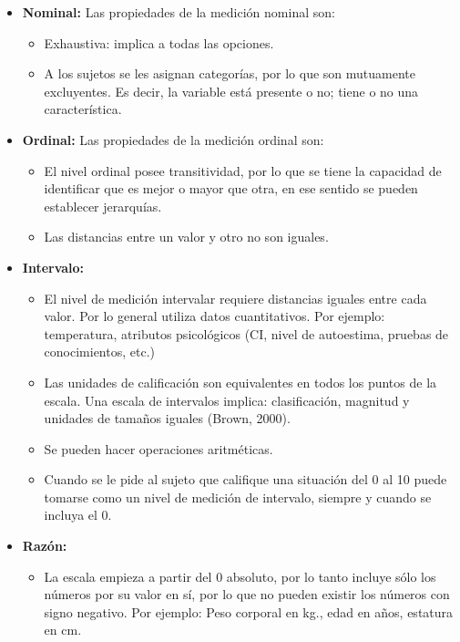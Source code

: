 \documentclass[a4paper]{report} %
\begin{document}
\begin{itemize}
\item \textbf{Nominal:} Las propiedades de la medici\'on nominal son:
\begin{itemize}
\item Exhaustiva: implica a todas las opciones.
\item A los sujetos se les asignan categor\'ias, por lo que son mutuamente excluyentes. Es decir, la variable est\'a presente o no; tiene o no una caracter\'istica.
\end{itemize}
\item \textbf{Ordinal:} Las propiedades de la medici\'on ordinal son:
\begin{itemize}
\item El nivel ordinal posee transitividad, por lo que se tiene la capacidad de identificar que es mejor o mayor que otra, en ese sentido se pueden establecer jerarqu\'ias.
\item Las distancias entre un valor y otro no son iguales.
\end{itemize}
\item \textbf{Intervalo:} 
\begin{itemize}
\item El nivel de medici\'on intervalar requiere distancias iguales entre cada valor. Por lo general utiliza datos cuantitativos. Por ejemplo: temperatura, atributos psicol\'ogicos (CI, nivel de autoestima, pruebas de conocimientos, etc.)
\item Las unidades de calificaci\'on son equivalentes en todos los puntos de la escala. Una escala de intervalos implica: clasificaci\'on, magnitud y unidades de tama\~nos iguales (Brown, 2000).
\item Se pueden hacer operaciones aritm\'eticas.
\item Cuando se le pide al sujeto que califique una situaci\'on del 0 al 10 puede tomarse como un nivel de medici\'on de intervalo, siempre y cuando se incluya el 0.
\end{itemize}
\item \textbf{Raz\'on:} 
\begin{itemize}
\item La escala empieza a partir del 0 absoluto, por lo tanto incluye s\'olo los n\'umeros por su valor en s\'i, por lo que no pueden existir los n\'umeros con signo negativo. Por ejemplo: Peso corporal en kg., edad en a\~nos, estatura en cm.
\end{itemize}
\end{itemize}
\end{document}
